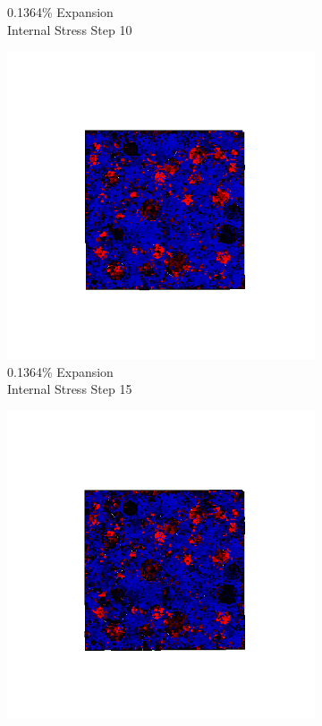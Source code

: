 \begin{figure}[ht!]
\begin{subfigure}{.25\textwidth}
      \caption{0.1364\% Expansion\\Internal Stress Step 10}
    \end{subfigure}%
    \begin{subfigure}{.25\textwidth}
      \centering
      \includegraphics[width=1.0\linewidth]{Files/exp_3D/ASR/A15P75_2_s15.png}
      \caption{0.1364\% Expansion\\Internal Stress Step 15}
    \end{subfigure}%
    \begin{subfigure}{.25\textwidth}
      \centering
      \includegraphics[width=1.0\linewidth]{Files/exp_3D/ASR/A15P75_2_stress.png}

\end{subfigure}
\end{figure}
